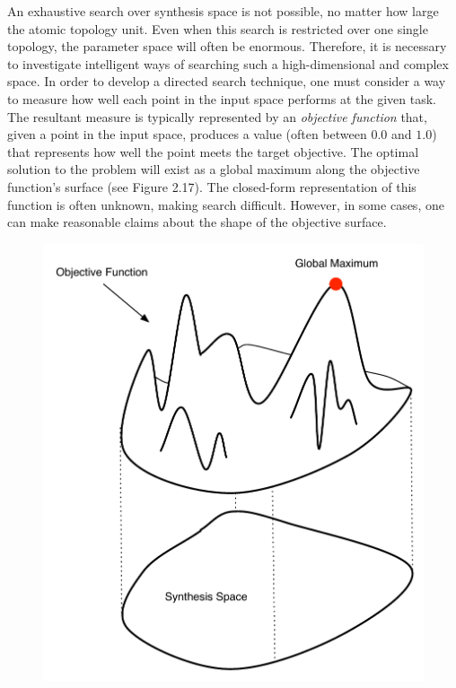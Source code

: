 \documentclass[a4paper,12pt]{report} 	%
\numberwithin{figure}{chapter}
\numberwithin{table}{chapter}
\numberwithin{equation}{chapter}
\begin{document}
\begin{flushleft}
An exhaustive search over synthesis space is not possible, no matter how large the atomic topology unit. Even when this search is restricted over one single topology, the parameter space will often be enormous. Therefore, it is necessary to investigate intelligent ways of searching such a high-dimensional and complex space. In order to develop a directed search technique, one must consider a way to measure how well each point in the input space performs at the given task. The resultant measure is typically represented by an \emph{objective function} that, given a point in the input space, produces a value (often between $0.0$ and $1.0$) that represents how well the point meets the target objective. The optimal solution to the problem will exist as a global maximum along the objective function's surface (see Figure 2.17). The closed-form representation of this function is often unknown, making search difficult. However, in some cases, one can make reasonable claims about the shape of the objective surface.
\\
\begin{figure}[h!]
\begin{center}
\includegraphics[scale=0.7]{FitnessFunction}

\end{center}
\end{figure}
\end{flushleft}
\end{document}
